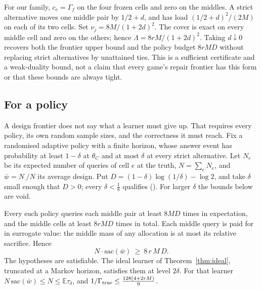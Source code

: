 For our family, $c_e=\Gamma_f$ on the four frozen cells and zero on the middles. A strict
alternative moves one middle pair by $1/2+d$, and has load $(1/2+d)^2/(2M)$ on each of its
two cells. Set $\nu_j=8M/(1+2d)^2$. The cover is exact on every middle cell and zero on the
others; hence $\Lambda=8rM/(1+2d)^2$. Taking $d\downarrow0$ recovers both the frontier upper
bound and the policy budget $8rMD$ without replacing strict alternatives by unattained ties.
This is a sufficient certificate and a weak-duality bound, not a claim that every game's
repair frontier has this form or that these bounds are always tight.

\subsection{For a policy}

A design frontier does not say what a learner must give up. That requires every policy, its
own random sample sizes, and the correctness it must reach. Fix a randomised adaptive policy
with a finite horizon, whose answer event has probability at least $1-\delta$ at $\theta_{C}$
and at most $\delta$ at every strict alternative. Let $N_{e}$ be its expected number of queries
of cell $e$ at the truth, $N=\sum_{e}N_{e}$, and $\bar w=N_{\cdot}/N$ its average design. Put
$D=(1-\delta)\log(1/\delta)-\log2$, and take $\delta$ small enough that $D>0$; every
$\delta<\frac18$ qualifies (). For larger $\delta$ the bounds below are void.

\begin{theorem}
\label{thm:sacrifice}
Every such policy queries each middle pair at least $8MD$ times in expectation, and the middle
cells at least $8rMD$ times in total. Each middle query is paid for in surrogate value: the
middle mass of any allocation is at most its relative sacrifice. Hence
\[
N\cdot\mathrm{sac}(\bar w)\ \ge\ 8\,r\,M\,D .
\]
The hypotheses are satisfiable. The ideal learner of Theorem~\ref{thm:ideal}, truncated at a
Markov horizon, satisfies them at level $2\delta$. For that learner
$N\,\mathrm{sac}(\bar w)\le N\le\mathbb{E}\tau_{\delta}$, and
$1/\Gamma_{\rm true}\le\frac{128(4+2rM)}{9}$.
\end{theorem}


